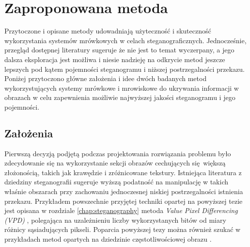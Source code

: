 {    \section{Zaproponowana metoda}\label{sec:assumptions}
    {
        Przytoczone i opisane metody udowadniają użyteczność i skuteczność wykorzystania systemów mrówkowych w celach
        steganograficznych. Jednocześnie, przegląd dostępnej literatury sugeruje że nie jest to temat wyczerpany, a jego
        dalsza eksploracja jest możliwa i niesie nadzieję na odkrycie metod jeszcze lepszych pod kątem pojemności
        steganogramu i niższej postrzegalności przekazu. Poniżej przytoczono główne założenia i idee dwóch badanych
        metod wykorzystujących systemy mrówkowe i mrowiskowe do ukrywania informacji w obrazach w celu zapewnienia
        możliwie najwyższej jakości steganogramu i jego pojemności.

        \subsection{Założenia}
        {
            Pierwszą decyzją podjętą podczas projektowania rozwiązania problemu było zdecydowanie się na wykorzystanie
            sekcji obrazów cechujących się większą złożonością, takich jak krawędzie i zróżnicowane tekstury. Istniejąca
            literatura z dziedziny steganografii sugeruje wyższą podatność na manipulację w takich właśnie obszarach
            przy zachowaniu jednoczesnej niskiej postrzegalności istnienia przekazu. Przykładem powszechnie przyjętej
            techniki opartej na powyższej tezie jest opisana w rozdziale \ref{chap:steganography} metoda \textit{Value
            Pixel Differencing \textnormal{(}VPD\textnormal{)}} \cite{Wu2003ASM}, polegająca na uzależnieniu liczby
            wykorzystanych bitów od miary różnicy sąsiadujących pikseli. Poparcia powyższej tezy można również szukać w
            przykładach metod opartych na dziedzinie częstotliwościowej obrazu \cite{Xuan2005LosslessDH}.

}}}

